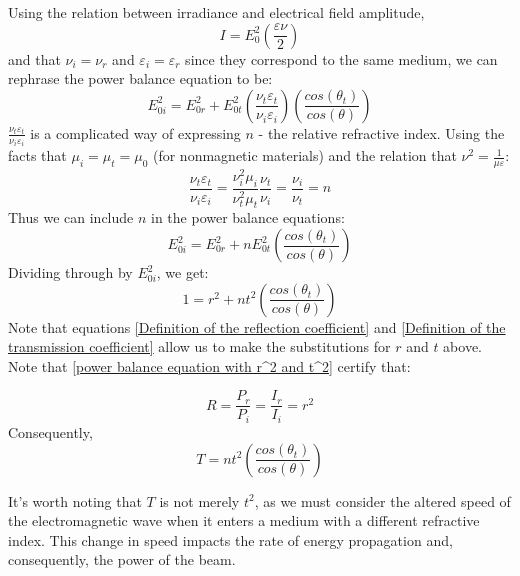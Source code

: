 Using the relation between irradiance and electrical field amplitude, 
\begin{equation}
I = E_{0}^2(\frac{\varepsilon \nu}{2})
\end{equation}
and that $\nu_i = \nu_r$ and $\varepsilon_i = \varepsilon_r$ since they correspond to the same medium, we can rephrase the power balance equation to be:
\begin{equation}
E_{0i}^2 = E_{0r}^2 + E_{0t}^2\left(\frac{\nu_t\varepsilon_t}{\nu_i\varepsilon_i}\right) \left(\frac{cos(\theta_t)}{cos(\theta)} \right)
\end{equation}
$\frac{\nu_t\varepsilon_t}{\nu_i\varepsilon_i}$ is a complicated way of expressing $n$ - the relative refractive index. Using the facts that $\mu_i = \mu_t = \mu_0$ (for nonmagnetic materials) and the relation that $\nu^2 = \frac{1}{\mu\varepsilon}$:
\begin{equation}
\frac{\nu_t\varepsilon_t}{\nu_i\varepsilon_i} = \frac{\nu_i^2\mu_i}{\nu_t^2\mu_t} \frac{\nu_t}{\nu_i} = \frac{\nu_i}{\nu_t} = n
\end{equation}
Thus we can include $n$ in the power balance equations:
\begin{equation}
E_{0i}^2 = E_{0r}^2 + n E_{0t}^2 \left(\frac{cos(\theta_t)}{cos(\theta)} \right)
\end{equation}
Dividing through by $E_{0i}^2$, we get:
\begin{equation} \label{power balance equation with r^2 and t^2}
1 = r^2 + n t^2 \left(\frac{cos(\theta_t)}{cos(\theta)} \right)
\end{equation}
Note that equations \ref{Definition of the reflection coefficient} and \ref{Definition of the transmission coefficient} allow us to make the substitutions for $r$ and $t$ above. Note that \ref{power balance equation with r^2 and t^2} certify that:

\begin{equation} \label{definition of R}
R = \frac{P_r}{P_i} = \frac{I_r}{I_i} = r^2
\end{equation}
Consequently,
\begin{equation} \label{definition of T}
T =  n t^2 \left(\frac{cos(\theta_t)}{cos(\theta)} \right)
\end{equation}

It's worth noting that $T$ is not merely $t^2$, as we must consider the altered speed of the electromagnetic wave when it enters a medium with a different refractive index. This change in speed impacts the rate of energy propagation and, consequently, the power of the beam.


